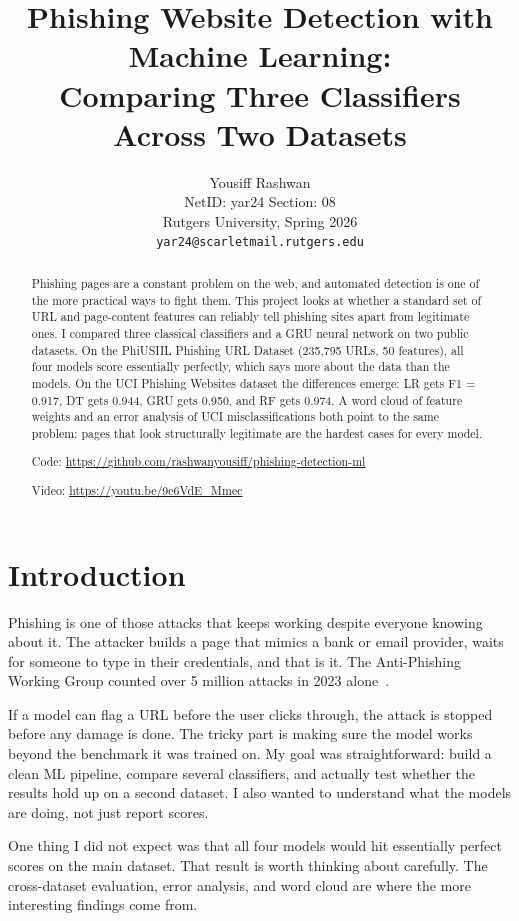 \documentclass{article}
\title{Phishing Website Detection with Machine Learning:\\
Comparing Three Classifiers Across Two Datasets}
\author{%
  Yousiff Rashwan \\
  NetID: yar24 \quad Section: 08 \\
  Rutgers University, Spring 2026 \\
  \texttt{yar24@scarletmail.rutgers.edu}
}
\begin{document}
\maketitle

\begin{abstract}
Phishing pages are a constant problem on the web, and automated detection is one of the more practical ways to fight them.
This project looks at whether a standard set of URL and page-content features can reliably tell phishing sites apart from legitimate ones.
I compared three classical classifiers and a GRU neural network on two public datasets.
On the PhiUSIIL Phishing URL Dataset (235,795 URLs, 50 features), all four models score essentially perfectly, which says more about the data than the models.
On the UCI Phishing Websites dataset the differences emerge: LR gets F1 = 0.917, DT gets 0.944, GRU gets 0.950, and RF gets 0.974.
A word cloud of feature weights and an error analysis of UCI misclassifications both point to the same problem: pages that look structurally legitimate are the hardest cases for every model.

Code: \url{https://github.com/rashwanyousiff/phishing-detection-ml}

Video: \url{https://youtu.be/9e6VdE_Mmec}
\end{abstract}

\section{Introduction}

Phishing is one of those attacks that keeps working despite everyone knowing about it.
The attacker builds a page that mimics a bank or email provider, waits for someone to type in their credentials, and that is it.
The Anti-Phishing Working Group counted over 5 million attacks in 2023 alone~\cite{apwg2023}.

If a model can flag a URL before the user clicks through, the attack is stopped before any damage is done.
The tricky part is making sure the model works beyond the benchmark it was trained on.
My goal was straightforward: build a clean ML pipeline, compare several classifiers, and actually test whether the results hold up on a second dataset.
I also wanted to understand what the models are doing, not just report scores.

One thing I did not expect was that all four models would hit essentially perfect scores on the main dataset.
That result is worth thinking about carefully.
The cross-dataset evaluation, error analysis, and word cloud are where the more interesting findings come from.
\end{document}
